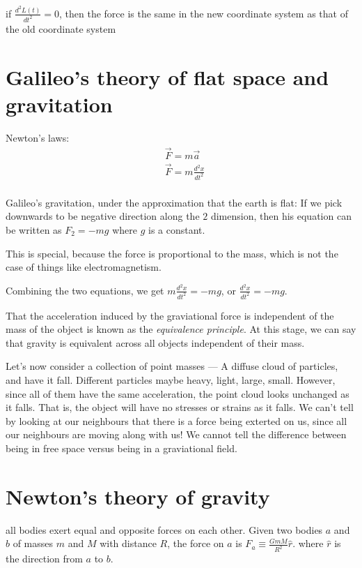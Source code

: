 \documentclass[11pt]{book}
\begin{document}
if $\frac{d^2 L(t)}{dt^2} = 0$, then the force is the same in the new coordinate
system as that of the old coordinate system

\section{Galileo's theory of flat space and gravitation}
Newton's laws:
\begin{align*}
    &\vec F = m \vec a \\
    &\vec F = m \frac{d^2 x}{dt^2} \\
\end{align*}

Galileo's gravitation, under the approximation that the earth is flat:
If we pick downwards to be negative direction along the $2$ dimension, then his
equation can be written as ${F_2 = - m g}$ where $g$ is a constant.

This is special, because the force is proportional to the mass, which is not
the case of things like electromagnetism.


Combining the two equations, we get ${m \frac{d^2x}{dt^2} = - m g}$, or
${\frac{d^2x}{dt^2} = - m g}$.


That the acceleration induced by the graviational force is independent of the
mass of the object is known as the \textit{equivalence principle}. At this
stage, we can say that gravity is equivalent across all objects independent of
their mass.

Let's now consider a collection of point masses --- A diffuse cloud of
particles, and have it fall. Different particles maybe heavy, light, large,
small. However, since all of them have the same acceleration, the point cloud
looks unchanged as it falls. That is, the object will have no stresses or
strains as it falls. We can't tell by looking at our neighbours that there is a
force being exterted on us, since all our neighbours are moving along with us!
We cannot tell the difference between being in free space versus being in a
graviational field.

\section{Newton's theory of gravity}
all bodies exert equal and opposite forces on each other. Given two bodies $a$
and $b$ of masses $m$ and $M$ with distance $R$, the force on $a$ is
${F_a \equiv \frac{GmM}{R^2}} \hat{r}$. where $\hat r$ is the direction from $a$
to $b$.
\end{document}
